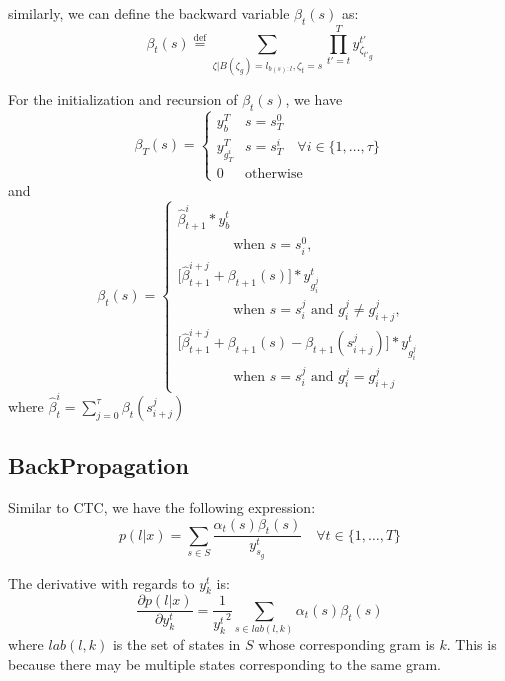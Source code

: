 \documentclass{article}
\begin{document}
similarly, we can define the backward variable $\beta_t(s)$ as:
\begin{equation}
\beta_t(s)\stackrel{\text{def}}{=}\sum_{\zeta | B(\zeta_g)=l_{b(s):l}, \zeta_t=s} \prod_{t'=t}^{T} y_{{\zeta_{t'}}_g}^{t'}
\end{equation}

For the initialization and recursion of $\beta_t(s)$, we have
\begin{equation}
\beta_T(s)=
\left \{
  \begin{array}{cl}
  y_b^T & s = s_T^0 \\
  y_{g_T^i}^T & s = s_T^i \quad \forall i\in\{1,\ldots,\tau\} \\
  0 & \text{otherwise}
  \end{array}
\right.
\end{equation}
and
\begin{equation}
\beta_t(s)=
\left \{
  \begin{array}{ll}
  \hat{\beta}_{t+1}^i*y^t_b \\ 
    ~~~~~~~~~~~~~~~~~~ \text{when } s = s_i^0,  \\
  \lbrack\hat{\beta}_{t+1}^{i+j} + \beta_{t+1}(s)\rbrack*y^t_{g_i^j} \\ 
    ~~~~~~~~~~~~~~~~~~ \text{when }s = s_i^j\text{ and }g_i^j\neq g_{i+j}^j,  \\
  \lbrack\hat{\beta}_{t+1}^{i+j} + \beta_{t+1}(s) - \beta_{t+1}(s_{i+j}^j)\rbrack*y^t_{g_i^j} \\
    ~~~~~~~~~~~~~~~~~~ \text{when }s = s_i^j\text{ and }g_i^j = g_{i+j}^j  
  \end{array}
\right.
\end{equation}
where $\hat{\beta}_t^i = \sum_{j=0}^{\tau}\beta_t(s_{i+j}^j)$

\subsection{BackPropagation}
\vspace{-4pt}
Similar to CTC, we have the following expression:
\begin{equation}
p(l|x)=\sum_{s\in S}\frac{\alpha_t(s)\beta_t(s)}{y^t_{s_g}} \quad \forall t\in \{1,\ldots, T\}
\end{equation}

The derivative with regards to $y^t_k$ is:
\begin{equation}
\frac{\partial p(l|x)}{\partial y^t_k}=\frac{1}{{y^t_k}^2}\sum_{s\in lab(l,k)}\alpha_t(s)\beta_t(s)
\end{equation}
where $lab(l,k)$ is the set of states in $S$ whose corresponding gram is $k$. This is because there may be multiple states corresponding to the same gram.
\end{document}
